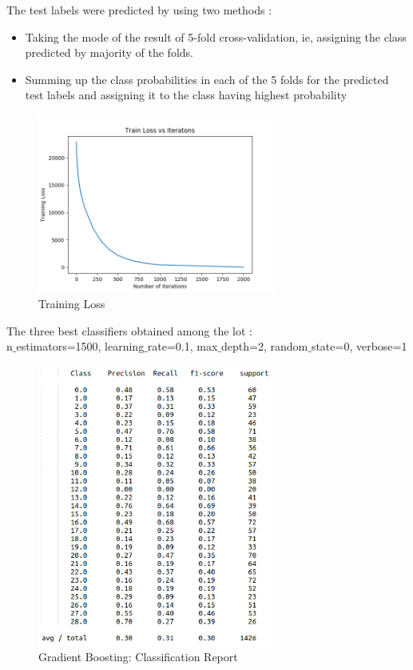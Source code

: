 \documentclass[12pt]{report}
\begin{document}
\newpage
The test labels were predicted by using two methods :
\begin{itemize}
    \item Taking the mode of the result of 5-fold cross-validation, ie, assigning the class predicted by majority of the folds.
    \item Summing up the class probabilities in each of the 5 folds for the predicted test labels and assigning it to the class having highest probability
\end{itemize}

\begin{figure}[H]
  \centering
  \includegraphics[width=0.7\textwidth]{Images/train_loss_gb.png}
  \caption{Training Loss}
\end{figure}

\newpage
The three best classifiers obtained among the lot :\\

n$\_$estimators=1500, learning$\_$rate=0.1, max$\_$depth=2, random$\_$state=0, verbose=1
\begin{figure}[H]
  \centering
  \includegraphics[width=0.7\textwidth]{Images/gb1.png}
  \caption{Gradient Boosting: Classification Report}
\end{figure}
\end{document}
